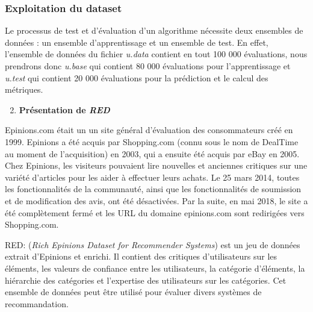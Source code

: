 \subsubsection*{Exploitation du dataset}
Le processus de test et d’évaluation d’un algorithme nécessite deux ensembles de données : un ensemble d’apprentissage et un ensemble de test.
En effet, l’ensemble de données du fichier \textit{u.data} contient en tout 100 000 évaluations, nous prendrons donc \textit{u.base} qui contient 80 000 évaluations pour l’apprentissage et \textit{u.test} qui contient 20 000 évaluations pour la prédiction et le calcul des métriques.

\begin{enumerate}[nosep,label=\textbf{\arabic*)}]
	\setcounter{enumi}{1}
	\item \textbf{Présentation de \textit{RED}}
\end{enumerate}\mbox{} \indent Epinions.com était un un site général d'évaluation des consommateurs créé en 1999. Epinions a été acquis par Shopping.com (connu sous le nom de DealTime au moment de l'acquisition) en 2003, qui a ensuite été acquis par eBay en 2005. Chez Epinions, les visiteurs pouvaient lire nouvelles et anciennes critiques sur une variété d’articles pour les aider à effectuer leurs achats. Le 25 mars 2014, toutes les fonctionnalités de la communauté, ainsi que les fonctionnalités de soumission et de modification des avis, ont été désactivées. Par la suite, en mai 2018, le site a été complètement fermé et les URL du domaine epinions.com sont redirigées vers Shopping.com.

RED: (\textit{Rich Epinions Dataset for Recommender Systems}) est un jeu de données extrait d'Epinions et enrichi. Il contient des critiques d'utilisateurs sur les éléments, les valeurs de confiance entre les utilisateurs, la catégorie d'éléments, la hiérarchie des catégories et l'expertise des utilisateurs sur les catégories. Cet ensemble de données peut être utilisé pour évaluer divers systèmes de recommandation.

